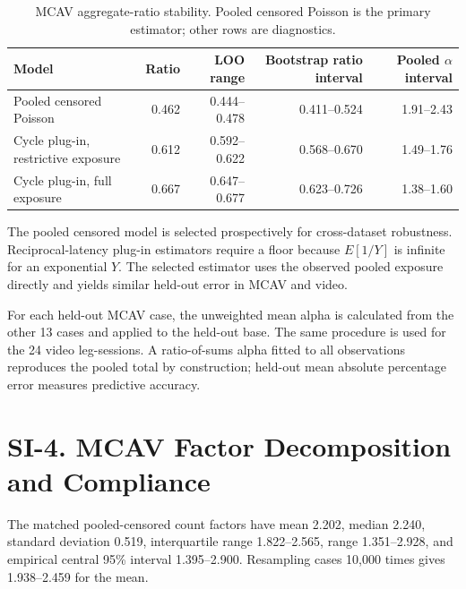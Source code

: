\documentclass[11pt]{article}
\begin{document}
\begin{table}[htbp]
\centering
\caption{MCAV aggregate-ratio stability. Pooled censored Poisson is the primary estimator; other rows are diagnostics.}
\footnotesize
\begin{tabular}{lrrrr}
\toprule
Model & Ratio & LOO range & Bootstrap ratio interval & Pooled \(\alpha\) interval \\
\midrule
Pooled censored Poisson & 0.462 & 0.444--0.478 & 0.411--0.524 & 1.91--2.43 \\
Cycle plug-in, restrictive exposure & 0.612 & 0.592--0.622 & 0.568--0.670 & 1.49--1.76 \\
Cycle plug-in, full exposure & 0.667 & 0.647--0.677 & 0.623--0.726 & 1.38--1.60 \\
\bottomrule
\end{tabular}
\end{table}

The pooled censored model is selected prospectively for cross-dataset robustness. Reciprocal-latency plug-in estimators require a floor because \(E[1/Y]\) is infinite for an exponential \(Y\). The selected estimator uses the observed pooled exposure directly and yields similar held-out error in MCAV and video.

For each held-out MCAV case, the unweighted mean alpha is calculated from the other 13 cases and applied to the held-out base. The same procedure is used for the 24 video leg-sessions. A ratio-of-sums alpha fitted to all observations reproduces the pooled total by construction; held-out mean absolute percentage error measures predictive accuracy.

\section*{SI-4. MCAV Factor Decomposition and Compliance}

The matched pooled-censored count factors have mean 2.202, median 2.240, standard deviation 0.519, interquartile range 1.822--2.565, range 1.351--2.928, and empirical central 95\% interval 1.395--2.900. Resampling cases 10,000 times gives 1.938--2.459 for the mean.
\end{document}

